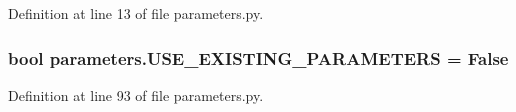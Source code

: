 Definition at line 13 of file parameters.\+py.

\subsubsection[{\texorpdfstring{U\+S\+E\+\_\+\+E\+X\+I\+S\+T\+I\+N\+G\+\_\+\+P\+A\+R\+A\+M\+E\+T\+E\+RS}{USE_EXISTING_PARAMETERS}}]{\setlength{\rightskip}{0pt plus 5cm}bool parameters.\+U\+S\+E\+\_\+\+E\+X\+I\+S\+T\+I\+N\+G\+\_\+\+P\+A\+R\+A\+M\+E\+T\+E\+RS = False}\hypertarget{namespaceparameters_a0cffcb215ac12a1700baedb1a13ec8d5}{}\label{namespaceparameters_a0cffcb215ac12a1700baedb1a13ec8d5}


Definition at line 93 of file parameters.\+py.

